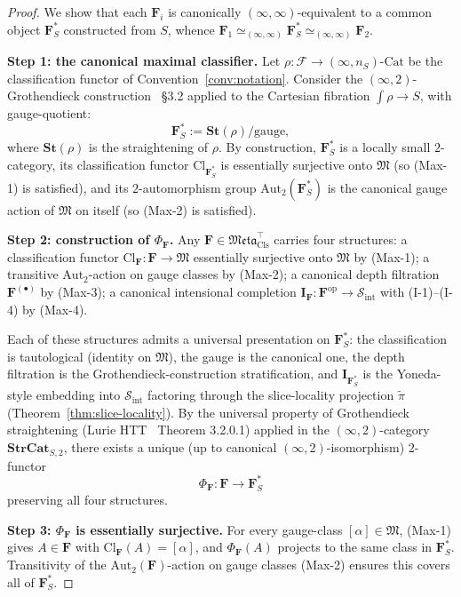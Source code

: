 \documentclass[11pt]{article}
\theoremstyle{plain}
\theoremstyle{definition}
\newcommand{\cS}{\mathcal{S}}
\newcommand{\cF}{\mathcal{F}}
\newcommand{\fM}{\mathfrak{M}}
\newcommand{\Meta}{\mathfrak{Meta}}
\newcommand{\Sint}{\cS_{\mathrm{int}}}
\newcommand{\Cl}{\mathrm{Cl}}
\newcommand{\Cat}{\mathrm{Cat}}
\newcommand{\II}{\mathbf{I}}
\begin{document}
\begin{proof}
We show that each $\mathbf{F}_i$ is canonically $(\infty, \infty)$-equivalent to a common object $\mathbf{F}_S^*$ constructed from $S$, whence $\mathbf{F}_1 \simeq_{(\infty, \infty)} \mathbf{F}_S^* \simeq_{(\infty, \infty)} \mathbf{F}_2$.

\textbf{Step 1: the canonical maximal classifier.} Let $\rho : \cF \to (\infty, n_S)\text{-}\Cat$ be the classification functor of Convention~\ref{conv:notation}. Consider the $(\infty, 2)$-Grothendieck construction~\cite{LurieHTT} \S 3.2 applied to the Cartesian fibration $\int \rho \to S$, with gauge-quotient:
\[ \mathbf{F}_S^* := \mathbf{St}(\rho) / \mathrm{gauge}, \]
where $\mathbf{St}(\rho)$ is the straightening of $\rho$. By construction, $\mathbf{F}_S^*$ is a locally small $2$-category, its classification functor $\Cl_{\mathbf{F}_S^*}$ is essentially surjective onto $\fM$ (so (Max-1) is satisfied), and its $2$-automorphism group $\mathrm{Aut}_2(\mathbf{F}_S^*)$ is the canonical gauge action of $\fM$ on itself (so (Max-2) is satisfied).

\textbf{Step 2: construction of $\Phi_\mathbf{F}$.} Any $\mathbf{F} \in \Meta_{\mathrm{Cls}}^{\top}$ carries four structures: a classification functor $\Cl_{\mathbf{F}} : \mathbf{F} \to \fM$ essentially surjective onto $\fM$ by (Max-1); a transitive $\mathrm{Aut}_2$-action on gauge classes by (Max-2); a canonical depth filtration $\mathbf{F}^{(\bullet)}$ by (Max-3); a canonical intensional completion $\II_{\mathbf{F}} : \mathbf{F}^{\mathrm{op}} \to \Sint$ with (I-1)--(I-4) by (Max-4).

Each of these structures admits a universal presentation on $\mathbf{F}_S^*$: the classification is tautological (identity on $\fM$), the gauge is the canonical one, the depth filtration is the Grothendieck-construction stratification, and $\II_{\mathbf{F}_S^*}$ is the Yoneda-style embedding into $\Sint$ factoring through the slice-locality projection $\tilde\pi$ (Theorem~\ref{thm:slice-locality}). By the universal property of Grothendieck straightening (Lurie HTT~\cite{LurieHTT} Theorem 3.2.0.1) applied in the $(\infty, 2)$-category $\mathbf{StrCat}_{S, 2}$, there exists a unique (up to canonical $(\infty, 2)$-isomorphism) $2$-functor
\[ \Phi_\mathbf{F} : \mathbf{F} \to \mathbf{F}_S^* \]
preserving all four structures.

\textbf{Step 3: $\Phi_\mathbf{F}$ is essentially surjective.} For every gauge-class $[\alpha] \in \fM$, (Max-1) gives $A \in \mathbf{F}$ with $\Cl_\mathbf{F}(A) = [\alpha]$, and $\Phi_\mathbf{F}(A)$ projects to the same class in $\mathbf{F}_S^*$. Transitivity of the $\mathrm{Aut}_2(\mathbf{F})$-action on gauge classes (Max-2) ensures this covers all of $\mathbf{F}_S^*$.


\end{proof}
\end{document}
